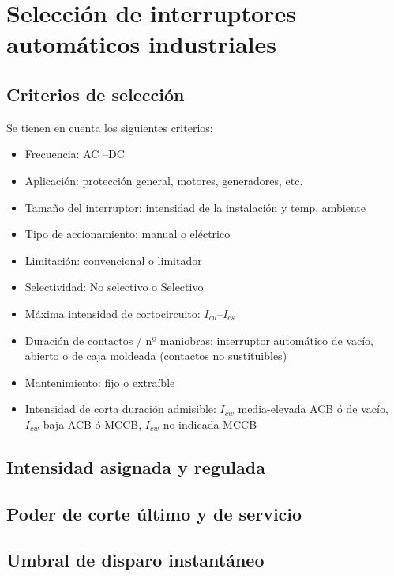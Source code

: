 \section{Selección de interruptores automáticos industriales}
\subsection{Criterios de selección}
Se tienen en cuenta los siguientes criterios:
\begin{itemize}
	\item Frecuencia: AC –DC
	\item Aplicación: protección general, motores, generadores, etc.
	\item Tamaño del interruptor: intensidad de la instalación y temp. ambiente
	\item Tipo de accionamiento: manual o eléctrico
	\item Limitación: convencional o limitador
	\item Selectividad: No selectivo o Selectivo
	\item Máxima intensidad de cortocircuito: $I_{cu}–I_{cs}$
	\item Duración de contactos / nº maniobras: interruptor automático de vacío, abierto o de caja moldeada (contactos no sustituibles)
	\item Mantenimiento: fijo o extraíble
	\item Intensidad de corta duración admisible: $I_{cw}$ media-elevada ACB ó de vacío, $I_{cw}$ baja ACB ó MCCB, $I_{cw}$ no indicada MCCB
\end{itemize}
\subsection{Intensidad asignada y regulada}
\subsection{Poder de corte último y de servicio}
\subsection{Umbral de disparo instantáneo}
